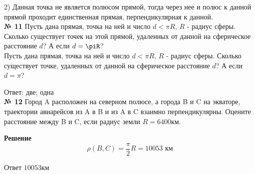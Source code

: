     2) Данная точка не является полюсом прямой, тогда через нее и полюс к данной прямой проходит
    единственная прямая, перпендикулярная к данной.\\

    \textbf{№ 11}
    Пусть дана прямая, точка на ней и число $d < \pi R$, $R$ - радиус сферы.
    Сколько существует точек на этой прямой, удаленных от данной на сферическое расстояние $d$?
    А если $d = \piR$?\\

    Пусть дана прямая, точка на ней и число $d < \pi R$, $R$ - радиус сферы.
    Сколько существует точке, удаленных от данной на сферическое расстояние $d$?
    А если $d = \pi$?

    Ответ: две; одна\\

    \textbf{№ 12}
    Город A расположен на северном полюсе, а города B и C на экваторе,
    траектории авиарейсов из A в B и из A в C взаимно перпендикулярны.
    Оцените расстояние между B и C, если радиус земли $R = 6400$км.

    \textbf{Решение}\\

    \[
        \rho(B, C) = \frac{\pi}{2}R = 10053 \text{ км}
    \]

    Ответ $10053$км

